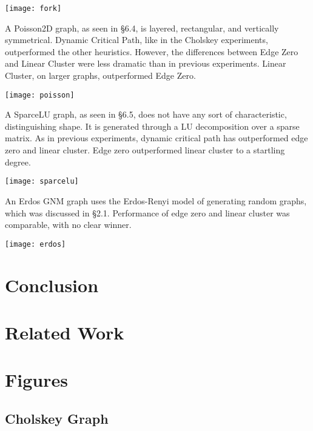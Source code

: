 \documentclass[11pt, oneside]{article}   	%
\begin{document}
\texttt{[image: fork]}
	
A Poisson2D graph, as seen in \S 6.4, is layered, rectangular, and vertically symmetrical. Dynamic Critical Path, like in the Cholskey experiments, outperformed the other heuristics. However, the differences between Edge Zero and Linear Cluster were less dramatic than in previous experiments. Linear Cluster, on larger graphs, outperformed Edge Zero.

\texttt{[image: poisson]}
	
A SparceLU graph, as seen in \S 6.5, does not have any sort of characteristic, distinguishing shape. It is generated through a LU decomposition over a sparse matrix. As in previous experiments, dynamic critical path has outperformed edge zero and linear cluster. Edge zero outperformed linear cluster to a startling degree.

\texttt{[image: sparcelu]}
	
An Erdos GNM graph uses the Erdos-Renyi model of generating random graphs, which was discussed in \S 2.1. Performance of edge zero and linear cluster was comparable, with no clear winner.

\texttt{[image: erdos]}


\section{Conclusion}

\section{Related Work}

\section{Figures}

\subsection{Cholskey Graph}
\vspace{20pt}
\end{document}
